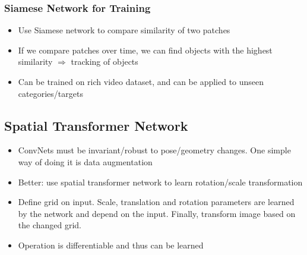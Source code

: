 \subsubsection{Siamese Network for Training}
\begin{itemize}
	\item Use Siamese network to compare similarity of two patches
	\item If we compare patches over time, we can find objects with the highest similarity $\Rightarrow$ tracking of objects
	\item Can be trained on rich video dataset, and can be applied to unseen categories/targets
\end{itemize}
\subsection{Spatial Transformer Network}
\begin{itemize}
	\item ConvNets must be invariant/robust to pose/geometry changes. One simple way of doing it is data augmentation
	\item Better: use spatial transformer network to learn rotation/scale transformation
	\item Define grid on input. Scale, translation and rotation parameters are learned by the network and depend on the input. Finally, transform image based on the changed grid. 
	\item Operation is differentiable and thus can be learned
\end{itemize}